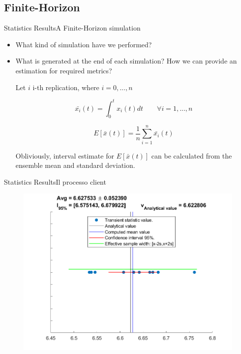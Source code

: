 \documentclass[10pt]{beamer}
\begin{document}
\subsection{Finite-Horizon}
\begin{frame}{Statistics Results}{A Finite-Horizon simulation}

\begin{itemize}
\item What kind of simulation have we performed?
\item What is generated at the end of each simulation? How we can provide an estimation for required metrics?

Let $i$ i-th replication, where $i = 0,...,n$

\begin{equation}
\bar{x_i}(t) = \int_0^t x_i(t)dt \qquad \forall i=1,...,n
\end{equation}

\begin{equation}
E[\bar{x}(t)] = \dfrac{1}{n} \sum_{i=1}^n \bar{x_i}(t)
\end{equation}

Obliviously, interval estimate for $E[\bar{x}(t)]$ can be calculated from the ensemble mean and standard deviation.

\end{itemize}

\end{frame}

\begin{frame}[fragile]{Statistics Results}{Il processo client}


\begin{figure}
\centering
\includegraphics[width=\textwidth]{./images/EnsembleStatisticsCloud_Class1JobsNumber.png}
\end{figure}

\end{frame}
\end{document}
